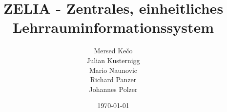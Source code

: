 \title{ZELIA - Zentrales, einheitliches Lehrrauminformationssystem }
\author{Mersed Kečo \\
Julian Kusternigg \\
Mario Naunovic \\
Richard Panzer \\
Johannes Polzer 
}
\date{\today}